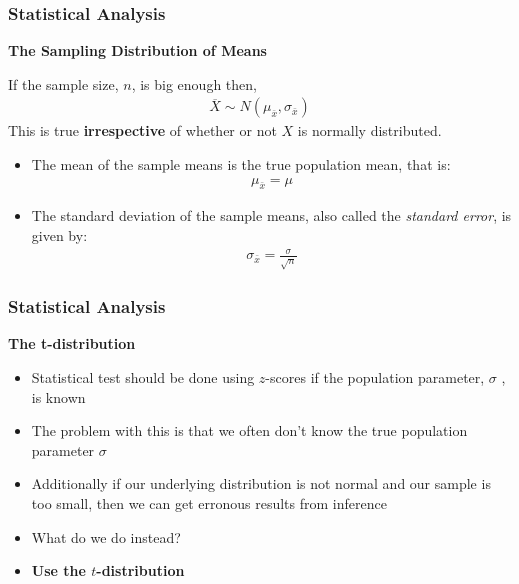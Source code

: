 \documentclass{beamer}
\begin{document}
\begin{frame}
\frametitle{Statistical Analysis}
\textbf{The Sampling Distribution of Means}\\
\vspace{0.5cm}
\begin{tcolorbox}
If the sample size, $n$, is big enough then,
\begin{align*}
	\overline{X} \sim N(\mu_{\bar{x}},\sigma_{\bar{x}})
\end{align*}
This is true \textbf{irrespective} of whether or not $X$ is normally distributed.
\end{tcolorbox}
\begin{itemize}
\item The mean of the sample means is the true population mean, that is:
\begin{align*}
\mu_{\bar{x}} = \mu
\end{align*}
\item The standard deviation of the sample means, also called the \textit{standard error}, is given by:
\begin{align*}
 \sigma_{\bar{x}} = \frac{\sigma}{\sqrt{n}}
\end{align*}
\end{itemize}
\end{frame}

\begin{frame}
\frametitle{Statistical Analysis}
\textbf{The t-distribution}\\
\vspace{0.5cm}
\begin{itemize}
\item Statistical test should be done using $z$-scores if the population parameter, $\sigma$ , is known
\vspace{0.5cm}
\item The problem with this is that we often don't know the true population parameter $\sigma$
\vspace{0.5cm}
\item Additionally if our underlying distribution is not normal and our sample is too small, then we can get erronous results from inference
\vspace{0.5cm}
\item What do we do instead?
\vspace{0.5cm}
\item \textbf{Use the $t$-distribution}
\end{itemize}
\end{frame}
\end{document}
